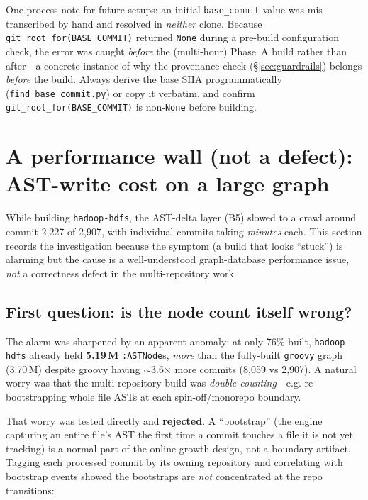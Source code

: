 \documentclass[11pt]{article}
\newcommand{\code}[1]{\texttt{#1}}
\begin{document}
One process note for future setups: an initial \code{base\_commit} value was
mis-transcribed by hand and resolved in \emph{neither} clone. Because
\code{git\_root\_for(BASE\_COMMIT)} returned \code{None} during a pre-build
configuration check, the error was caught \emph{before} the (multi-hour) Phase~A
build rather than after---a concrete instance of why the provenance check
(\S\ref{sec:guardrails}) belongs \emph{before} the build. Always derive the base SHA
programmatically (\code{find\_base\_commit.py}) or copy it verbatim, and confirm
\code{git\_root\_for(BASE\_COMMIT)} is non-\code{None} before building.

\section{A performance wall (not a defect): AST-write cost on a large graph}
\label{sec:perfwall}
While building \code{hadoop-hdfs}, the AST-delta layer (B5) slowed to a crawl
around commit 2{,}227 of 2{,}907, with individual commits taking \emph{minutes}
each. This section records the investigation because the symptom (a build that
looks ``stuck'') is alarming but the cause is a well-understood graph-database
performance issue, \emph{not} a correctness defect in the multi-repository work.

\subsection{First question: is the node count itself wrong?}
The alarm was sharpened by an apparent anomaly: at only 76\% built,
\code{hadoop-hdfs} already held \textbf{5.19\,M} \code{:ASTNode}s, \emph{more}
than the fully-built \code{groovy} graph (3.70\,M) despite groovy having
$\sim$3.6$\times$ more commits (8{,}059 vs 2{,}907). A natural worry was that the
multi-repository build was \emph{double-counting}---e.g. re-bootstrapping whole
file ASTs at each spin-off/monorepo boundary.

That worry was tested directly and \textbf{rejected}. A ``bootstrap'' (the engine
capturing an entire file's AST the first time a commit touches a file it is not
yet tracking) is a normal part of the online-growth design, not a boundary
artifact. Tagging each processed commit by its owning repository and correlating
with bootstrap events showed the bootstraps are \emph{not} concentrated at the
repo transitions:
\end{document}
